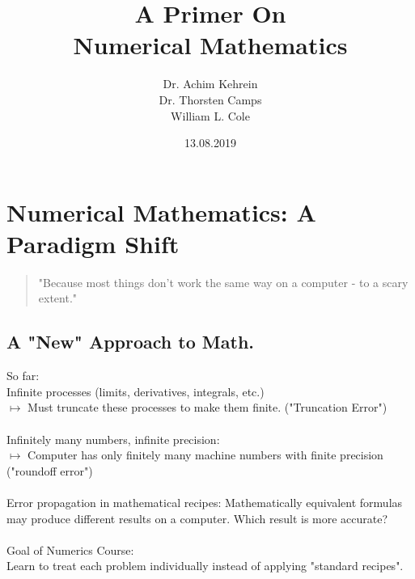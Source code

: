 \documentclass[a4paper,12pt,]{report}
\begin{document}
\title{\Large{\textbf{A Primer On \\Numerical Mathematics}}}
	\author{Dr. Achim Kehrein \\ Dr. Thorsten Camps\\William L. Cole}
	\date{13.08.2019}

	\maketitle
	\tableofcontents

	\setcounter{page}{2}

	\fancyhf{}

\renewcommand{\headrulewidth}{2pt}
\renewcommand{\footrulewidth}{2pt}

\fancyhead[LE]{\leftmark}
	\fancyhead[RO]{\nouppercase{\rightmark}}
	\fancyfoot[LE,RO]{\thepage}

	\renewcommand{\thefootnote}{\fnsymbol{footnote}}

\setcounter{chapter}{-1}
\chapter{Numerical Mathematics: A Paradigm Shift}

\begin{quote}
	"Because most things don't work the same way on a computer - to a scary extent."\\
\end{quote}

\section{A "New" Approach to Math.}


	So far:\\
	Infinite processes (limits, derivatives, integrals, etc.)\\
	$\longmapsto$ Must truncate these processes to make them finite. ("Truncation Error")\\
\\
	Infinitely many numbers, infinite precision:\\
	$\longmapsto$ Computer has only finitely many machine numbers with finite precision ("roundoff 
	error")\\
\\
	Error propagation in mathematical recipes: Mathematically equivalent formulas may produce 
	different results on a computer. Which result is
	more accurate?\\
\\
	Goal of Numerics Course:\\
	Learn to treat each problem individually instead of applying "standard recipes".\\
\end{document}
